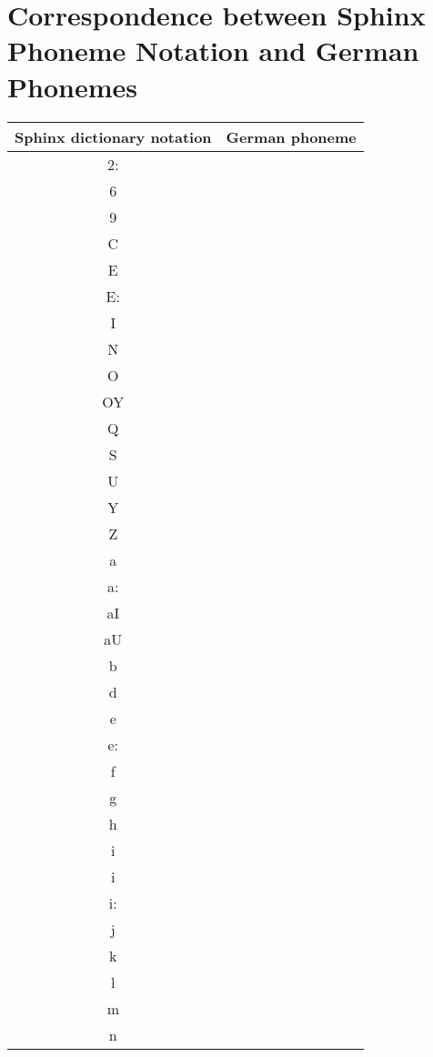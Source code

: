 \chapter{Correspondence between Sphinx Phoneme Notation and German Phonemes }
\label{chap:appA}
\begin {longtable}{| c | c |}
    \hline
    Sphinx dictionary notation & German phoneme \\ \hline
    2:  &  \\ \hline
    6 &  \\ \hline
    9  &  \\ \hline
    C  &  \\ \hline
    E  & \\ \hline
    E:  & \\ \hline 
    I  & \\ \hline 
    N  & \\ \hline 
    O  & \\ \hline 
    OY  & \\ \hline 
    Q  & \\ \hline 
    S  & \\ \hline 
    U  & \\ \hline 
    Y  & \\ \hline 
    Z  & \\ \hline 
    a  & \\ \hline 
    a:  & \\ \hline
    aI   & \\ \hline
    aU  & \\ \hline
    b  & \\ \hline
    d  & \\ \hline
    e  & \\ \hline
    e:  & \\ \hline
    f  & \\ \hline
    g  & \\ \hline
    h  & \\ \hline
    i  & \\ \hline 
    i  & \\ \hline 
    i:  & \\ \hline 
    j  & \\ \hline 
    k  & \\ \hline 
    l  & \\ \hline 
    m & \\ \hline 
    n  & \\ \hline 

\end{longtable}
